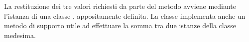 La restituzione dei tre valori richiesti da parte del metodo  avviene mediante l'istanza di una classe , appositamente definita. La classe implementa anche un metodo di supporto utile ad effettuare la somma tra due istanze della classe medesima.

